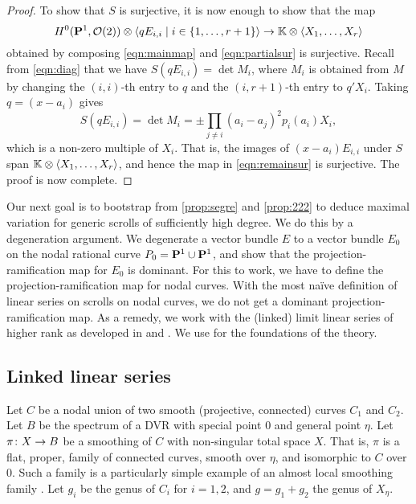 \begin{proof}
  To show that $S$ is surjective, it is now enough to show that the map
  \begin{equation}\label{eqn:remainsur}
    H^0(\P^1, \O(2)) \otimes \langle  qE_{i,i} \mid i \in \{1, \dots, r+1\} \rangle \to \k \otimes \langle  X_1, \dots, X_r \rangle
  \end{equation}
  obtained by composing \eqref{eqn:mainmap} and \eqref{eqn:partialsur} is surjective.
  Recall from \eqref{eqn:diag} that we have $S(qE_{i,i}) = \det M_i$, where $M_i$ is obtained from $M$ by changing the $(i,i)$-th entry to $q$ and the $(i, r+1)$-th entry to $q'X_i$.
  Taking $q = (x-a_i)$ gives
  \[ S(qE_{i,i}) = \det M_i = \pm \prod_{j \neq i} (a_i-a_j)^2 p_i(a_i) X_i,\]
  which is a non-zero multiple of $X_i$.
  That is, the images of $(x-a_i)E_{i,i}$ under $S$ span $\k \otimes \langle  X_1, \dots, X_r \rangle$, and hence the map in \eqref{eqn:remainsur} is surjective.
  The proof is now complete.
\end{proof}

Our next goal is to bootstrap from \autoref{prop:segre} and \autoref{prop:222} to deduce maximal variation for generic scrolls of sufficiently high degree.
We do this by a degeneration argument.
We degenerate a vector bundle $E$ to a vector bundle $E_0$ on the nodal rational curve $P_0 = \P^1 \cup \P^1$, and show that the projection-ramification map for $E_0$ is dominant.
For this to work, we have to define the projection-ramification map for nodal curves.
With the most na\"ive definition of linear series on scrolls on nodal curves, we do not get a dominant projection-ramification map.
As a remedy, we work with the (linked) limit linear series of higher rank as developed in \cite{tei-i-big:91} and \cite{oss:14}.
We use \cite{oss:14} for the foundations of the theory.

\subsection{Linked linear series}\label{sec:lls}
Let $C$ be a nodal union of two smooth (projective, connected) curves $C_1$ and $C_2$.
Let $B$ be the spectrum of a DVR with special point $0$ and general point $\eta$.
Let $\pi \from X \to B$ be a smoothing of $C$ with non-singular total space $X$.
That is, $\pi$ is a flat, proper, family of connected curves, smooth over $\eta$, and isomorphic to $C$ over $0$.
Such a family is a particularly simple example of an almost local smoothing family \cite[\S~2.1--2.2]{oss:14}.
Let $g_i$ be the genus of $C_i$ for $i = 1, 2$, and $g = g_1+g_2$ the genus of $X_\eta$.

